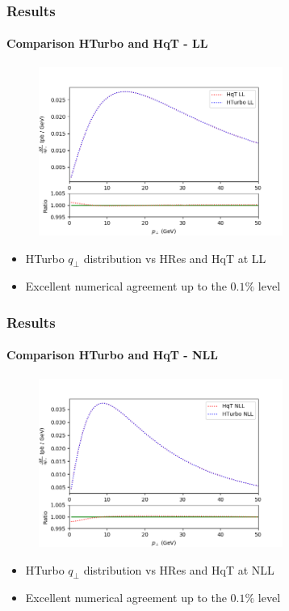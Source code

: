 \documentclass[aspectratio=43]{beamer}
\begin{document}
\begin{frame}
	
	\frametitle{Results}
	\framesubtitle{Comparison HTurbo and HqT - LL}
	
	\begin{figure}
		\includegraphics[width = 8cm]{plots/hturbo_LL.png}
	\end{figure}
	
	\begin{itemize}
		\item HTurbo $q_{\perp}$ distribution vs HRes and HqT at LL
		\item Excellent numerical agreement up to the $0.1\%$ level
	\end{itemize}

\end{frame}

\begin{frame}

	\frametitle{Results}
	\framesubtitle{Comparison HTurbo and HqT - NLL}
	
	\begin{figure}
		\includegraphics[width = 8cm]{plots/hturbo_NLL_noevol.png}
	\end{figure}
	
	\begin{itemize}
		\item HTurbo $q_{\perp}$ distribution vs HRes and HqT at NLL
		\item Excellent numerical agreement up to the $0.1\%$ level
	\end{itemize}

\end{frame}
\end{document}
